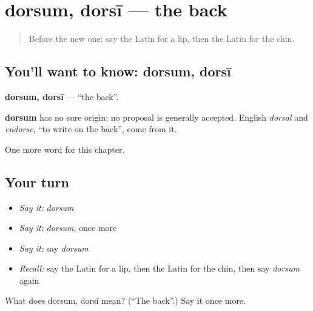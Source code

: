 \section[dorsum, dorsī]{dorsum, dorsī — the back}

\label{lesson:LA-C135-dorsum}



\begin{quote}
Before the new one: say the Latin for a lip, then the Latin for the chin.
\end{quote}

\subsection*{You'll want to know: dorsum, dorsī}
\textbf{dorsum, dorsī} — \textquotedblleft{}the back\textquotedblright{}.

\begin{cousinweb}
\textbf{dorsum} has no sure origin; no proposal is generally accepted. English \emph{dorsal} and \emph{endorse}, \textquotedblleft{}to write on the back\textquotedblright{}, come from it.
\end{cousinweb}

\begin{grammarlens}[title={What you've built}]
One more word for this chapter.
\end{grammarlens}

\subsection*{Your turn}
\begin{itemize}
\raggedright
  \item \emph{Say it:} \emph{dorsum}
  \item \emph{Say it:} \emph{dorsum}, once more
  \item \emph{Say it:} say \emph{dorsum}
  \item \emph{Recall:} say the Latin for a lip, then the Latin for the chin, then say \emph{dorsum} again
\end{itemize}

\begin{tcolorbox}[breakable,colback=teal!4,colframe=teal!35!black,title={Before you move on}]
What does dorsum, dorsī mean? (\textquotedblleft{}The back\textquotedblright{}.) Say it once more.
\end{tcolorbox}
